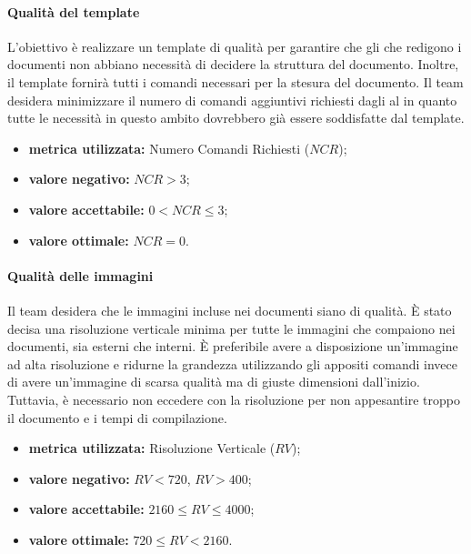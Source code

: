 			\paragraph{Qualità del template}
				\label{OQDT}
				L'obiettivo è realizzare un template di qualità per garantire che gli \analisti{} che redigono i documenti non abbiano necessità di decidere la struttura del documento. Inoltre, il  template fornirà tutti i comandi necessari per la stesura del documento. Il team desidera minimizzare il numero di comandi aggiuntivi richiesti dagli \analisti{} al \responsabile{} in quanto tutte le necessità in questo ambito dovrebbero già essere soddisfatte dal template.
				\begin{itemize}
					\item \textbf{metrica utilizzata:} Numero Comandi Richiesti ($NCR$);
					\item \textbf{valore negativo:} $NCR>3$;
					\item \textbf{valore accettabile:} $0<NCR \leq 3$;
					\item \textbf{valore ottimale:} $NCR=0$.
				\end{itemize}
			
			\paragraph{Qualità delle immagini}
				\label{OQDI}
				Il team desidera che le immagini incluse nei documenti siano di qualità. È stato decisa una risoluzione verticale minima per tutte le immagini che compaiono nei documenti, sia esterni che interni. È preferibile avere a disposizione un'immagine ad alta risoluzione e ridurne la grandezza utilizzando gli appositi comandi  invece di avere un'immagine di scarsa qualità ma di giuste dimensioni dall'inizio. Tuttavia, è necessario non eccedere con la risoluzione per non appesantire troppo il documento e i tempi di compilazione.
			\begin{itemize}
				\item \textbf{metrica utilizzata:} Risoluzione Verticale ($RV$);
				\item \textbf{valore negativo:} $RV<720$, $RV>400$;
				\item \textbf{valore accettabile:} $2160 \leq RV \leq 4000$;
				\item \textbf{valore ottimale:} $720 \leq RV < 2160$.
			\end{itemize}
		
